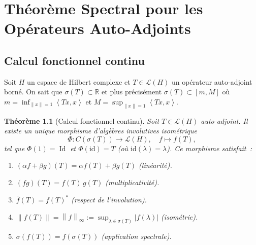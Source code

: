 \documentclass[a4paper,12pt]{book}
\DeclareMathOperator{\Id}{Id}
\newcommand{\R}{\mathbb{R}}
\newcommand{\norm}[1]{\left\| #1 \right\|}
\newcommand{\abs}[1]{\left| #1 \right|}
\newcommand{\inner}[2]{\left\langle #1, #2 \right\rangle}
\theoremstyle{definition}
\theoremstyle{plain}
\newtheorem{theoreme}[definition]{Théorème}
\theoremstyle{remark}
\begin{document}
\chapter{Théorème Spectral pour les Opérateurs Auto-Adjoints}
\label{chap:spectral-autoadjoint}
\minitoc

\section{Calcul fonctionnel continu}

Soit $H$ un espace de Hilbert complexe et $T \in \mathcal{L}(H)$ un opérateur
auto-adjoint borné. On sait que $\sigma(T) \subset \R$ et plus précisément
$\sigma(T) \subset [m, M]$ où $m = \inf_{\norm{x}=1}\inner{Tx}{x}$ et
$M = \sup_{\norm{x}=1}\inner{Tx}{x}$.

\begin{theoreme}[Calcul fonctionnel continu]
\label{thm:calcul-fonctionnel-continu}
Soit $T \in \mathcal{L}(H)$ auto-adjoint. Il existe un unique morphisme d'algèbres
involutives isométrique
\[
  \Phi : C(\sigma(T)) \to \mathcal{L}(H), \quad f \mapsto f(T),
\]
tel que $\Phi(1) = \Id$ et $\Phi(\mathrm{id}) = T$ (où $\mathrm{id}(\lambda) = \lambda$).
Ce morphisme satisfait~:
\begin{enumerate}[label=(\roman*)]
  \item $(\alpha f + \beta g)(T) = \alpha f(T) + \beta g(T)$ (linéarité).
  \item $(fg)(T) = f(T)\,g(T)$ (multiplicativité).
  \item $\bar f(T) = f(T)^*$ (respect de l'involution).
  \item $\norm{f(T)} = \norm{f}_\infty := \sup_{\lambda \in \sigma(T)} \abs{f(\lambda)}$
        (isométrie).
  \item $\sigma(f(T)) = f(\sigma(T))$ (application spectrale).
\end{enumerate}
\end{theoreme}
\end{document}
